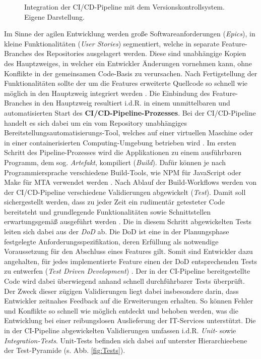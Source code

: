 \begin{center}
	\begin{figure}[H]\hspace*{-9mm}
		\centering
		\caption[Integration der CI/CD-Pipeline mit dem Versionskontrollsystem]{Integration der CI/CD-Pipeline mit dem Versionskontrollsystem. Eigene Darstellung.}
		\label{fig:VCS}
	\end{figure}
\end{center}
\vspace*{-15mm}
Im Sinne der agilen Entwicklung werden große Softwareanforderungen (\textit{Epics}), in kleine Funktionalitäten (\textit{User Stories}) segmentiert, welche in separate Feature-Bran\-ches des Repositories ausgelagert werden. Diese sind unabhängige Kopien des Haupt\-zweiges, in welcher ein Entwickler Änderungen vornehmen kann, ohne Konflikte in der gemeinsamen Code-Basis zu verursachen. Nach Fertigstellung der Funktionalitäten sollte der um die Features erweiterte Quellcode so schnell wie möglich in den Hauptzweig integriert werden \cite[337]{Schmiedmayer.52220225242022}. Die Einbindung des Feature-Branches in den Hauptzweig resultiert i.d.R. in einem unmittelbaren und automatisierten Start des \textbf{CI/CD-Pipeline-Prozesses}. Bei der CI/CD-Pipeline handelt es sich dabei um ein vom Repository unabhängiges Bereitstellungsautomati\-sierungs-Tool, welches auf einer virtuellen Maschine oder in einer containerisierten Computing-Umgebung betrieben wird \cite{Codefresh.20230419}. Im ersten Schritt des Pipeline-Prozesses wird die Applikationen zu einem ausführ\-baren Programm, dem sog. \textit{Artefakt}, kompiliert (\textit{Build}). Dafür können je nach Programmiersprache verschiedene Build-Tools, wie NPM für JavaScript oder Make für \ac{MTA} verwendet werden \cite[737]{Lange.2023}. Nach Ablauf der Build-Workflows werden von der CI/CD-Pipeline verschiedene Validierungen abgewickelt (\textit{Test}). Damit soll sichergestellt werden, dass zu jeder Zeit ein rudimentär getesteter Code bereitsteht und grundlegende Funktionalitäten sowie Schnittstellen erwartungsgemäß ausgeführt werden \cite[19]{Halstenberg.2020}. Die in diesem Schritt abgewickelten Tests leiten sich dabei aus der \textit{\ac{DoD}} ab. Die DoD ist eine in der Planungsphase festgelegte Anforderungsspezifikation, deren Erfüllung als notwendige Voraussetzung für den Abschluss eines Features gilt. Somit sind Entwickler dazu angehalten, für jedes implementierte Feature einen der DoD entsprechenden Tests zu entwerfen (\textit{Test Driven Development}) \cite{.20230419}. Der in der CI-Pipeline bereitgestellte Code wird dabei überwiegend anhand schnell durchführbarer Tests überprüft. Der Zweck dieser zügigen Validierungen liegt dabei insbesondere darin, dass Entwickler zeitnahes Feedback auf die Erweiterungen erhalten. So können Fehler und Konflikte so schnell wie möglich entdeckt und behoben werden, was die Entwicklung bei einer reibungslosen Auslieferung der IT-Services unterstützt. Die in der CI-Pipeline abgewickelten Validierungen umfassen i.d.R. \textit{Unit-} sowie \textit{Integration-Tests}. Unit-Tests befinden sich dabei auf unterster Hierarchieebene der Test-Pyramide (s. Abb. \ref{fig:Tests}).
